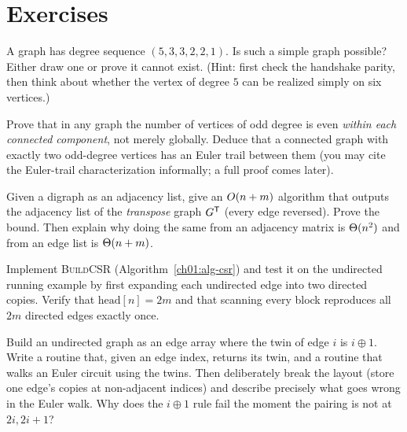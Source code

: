 \section{Exercises}
\label{ch01:exercises}

\begin{exercise}
\label{ch01:ex-handshake}
A graph has degree sequence $(5,3,3,2,2,1)$. Is such a simple graph possible?
Either draw one or prove it cannot exist. (Hint: first check the handshake
parity, then think about whether the vertex of degree $5$ can be realized
simply on six vertices.)
\end{exercise}

\begin{exercise}
\label{ch01:ex-components}
Prove that in any graph the number of vertices of odd degree is even
\emph{within each connected component}, not merely globally. Deduce that a
connected graph with exactly two odd-degree vertices has an Euler trail between
them (you may cite the Euler-trail characterization informally; a full proof
comes later).
\end{exercise}

\begin{exercise}
\label{ch01:ex-transpose}
Given a digraph as an adjacency list, give an $O(n+m)$ algorithm that outputs
the adjacency list of the \emph{transpose} graph $G^{\mathsf T}$ (every edge
reversed). Prove the bound. Then explain why doing the same from an adjacency
matrix is $\Theta(n^2)$ and from an edge list is $\Theta(n+m)$.
\end{exercise}

\begin{exercise}
\label{ch01:ex-csr}
Implement \textsc{BuildCSR} (Algorithm~\ref{ch01:alg-csr}) and test it on the
undirected running example by first expanding each undirected edge into two
directed copies. Verify that $\mathrm{head}[n] = 2m$ and that scanning every
block reproduces all $2m$ directed edges exactly once.
\end{exercise}

\begin{exercise}
\label{ch01:ex-twin}
Build an undirected graph as an edge array where the twin of edge $i$ is
$i \oplus 1$. Write a routine that, given an edge index, returns its twin, and a
routine that walks an Euler circuit using the twins. Then deliberately break the
layout (store one edge's copies at non-adjacent indices) and describe precisely
what goes wrong in the Euler walk. Why does the $i \oplus 1$ rule fail the moment
the pairing is not at $2i, 2i{+}1$?
\end{exercise}

